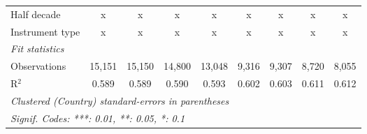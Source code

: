 \begin{tabular}{lcccccccc}
   Half decade                                                & x            & x            & x            & x           & x             & x             & x             & x\\  
   Instrument type                                            & x            & x            & x            & x           & x             & x             & x             & x\\  
   \midrule \emph{Fit statistics}\\
   Observations                                               & 15,151       & 15,150       & 14,800       & 13,048      & 9,316         & 9,307         & 8,720         & 8,055\\  
   R$^2$                                                      & 0.589        & 0.589        & 0.590        & 0.593       & 0.602         & 0.603         & 0.611         & 0.612\\  
   \midrule
   \multicolumn{9}{l}{\emph{Clustered (Country) standard-errors in parentheses}}\\
   \multicolumn{9}{l}{\emph{Signif. Codes: ***: 0.01, **: 0.05, *: 0.1}}\\
\end{tabular}
\par\endgroup


